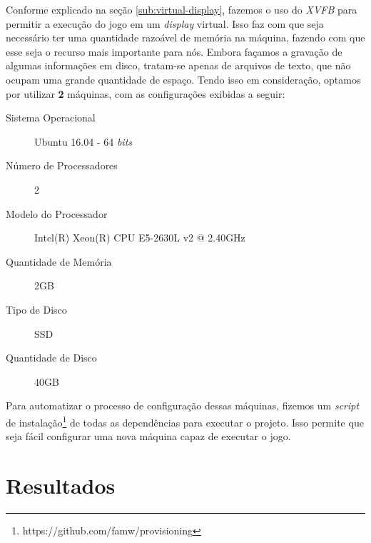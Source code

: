Conforme explicado na seção \ref{sub:virtual-display}, fazemos o uso do
\textit{XVFB} para permitir a execução do jogo em um \textit{display} virtual.
Isso faz com que seja necessário ter uma quantidade razoável de memória na
máquina, fazendo com que esse seja o recurso mais importante para nós. Embora
façamos a gravação de algumas informações em disco, tratam-se apenas de
arquivos de texto, que não ocupam uma grande quantidade de espaço. Tendo isso
em consideração, optamos por utilizar \textbf{2} máquinas, com as configurações
exibidas a seguir:

\begin{description}
    \item [Sistema Operacional] Ubuntu 16.04 - 64 \textit{bits}
    \item [Número de Processadores] 2
    \item [Modelo do Processador] Intel(R) Xeon(R) CPU E5-2630L v2 @ 2.40GHz
    \item [Quantidade de Memória] 2GB
    \item [Tipo de Disco] SSD
    \item [Quantidade de Disco] 40GB
\end{description}

Para automatizar o processo de configuração dessas máquinas, fizemos um
\textit{script} de instalação\footnote{https://github.com/famw/provisioning} de
todas as dependências para executar o projeto. Isso permite que seja fácil
configurar uma nova máquina capaz de executar o jogo.

\section{\label{section:results}Resultados}

